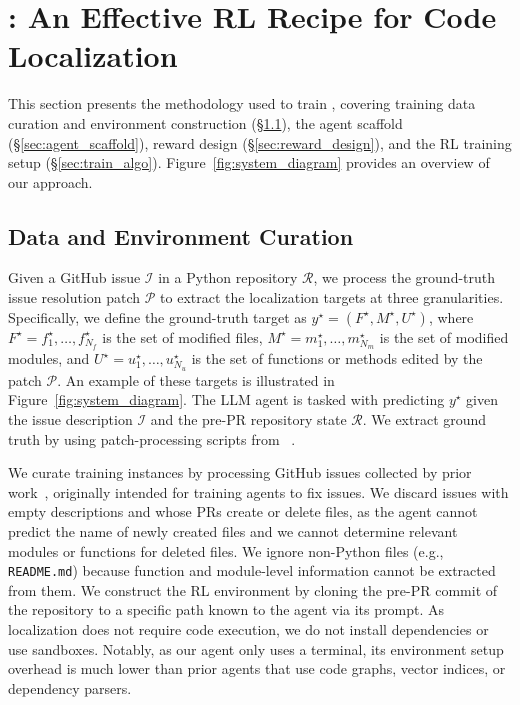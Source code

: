\section{\methodname: An Effective RL Recipe for Code Localization}

This section presents the methodology used to train \methodname, covering training data curation and environment construction (\S\ref{sec:data_creation}), the agent scaffold (\S\ref{sec:agent_scaffold}), reward design (\S\ref{sec:reward_design}), and the RL training setup (\S\ref{sec:train_algo}). Figure~\ref{fig:system_diagram} provides an overview of our approach.



\subsection{Data and Environment Curation}
\label{sec:data_creation}
Given a GitHub issue $\mathcal{I}$ in a Python repository $\mathcal{R}$, we process the ground-truth issue resolution patch $\mathcal{P}$ to extract the localization targets at three granularities. Specifically, we define the ground-truth target as $y^{\star} = (F^{\star}, M^{\star}, U^{\star})$, where $F^{\star} = {f_1^{\star}, \dots, f_{N_f}^{\star}}$ is the set of modified files, $M^{\star} = {m_1^{\star}, \dots, m_{N_m}^{\star}}$ is the set of modified modules, and $U^{\star} = {u_1^{\star}, \dots, u_{N_u}^{\star}}$ is the set of functions or methods edited by the patch $\mathcal{P}$. An example of these targets is illustrated in Figure~\ref{fig:system_diagram}. The LLM agent is tasked with predicting $y^{\star}$ given the issue description $\mathcal{I}$ and the pre-PR repository state $\mathcal{R}$. We extract ground truth by using patch-processing scripts from ~\citet{chen-etal-2025-locagent}.

We curate training instances by processing GitHub issues collected by prior work~\citep{yang2025swesmithscalingdatasoftware, pan2025trainingsoftwareengineeringagents}, originally intended for training agents to fix issues. We discard issues with empty descriptions and whose PRs create or delete files, as the agent cannot predict the name of newly created files and we cannot determine relevant modules or functions for deleted files. We ignore non-Python files (e.g., \texttt{README.md}) because function and module-level information cannot be extracted from them. We construct the RL environment by cloning the pre-PR commit of the repository to a specific path known to the agent via its prompt. As localization does not require code execution, we do not install dependencies or use sandboxes. Notably, as our agent only uses a terminal, its environment setup overhead is much lower than prior agents that use code graphs, vector indices, or dependency parsers.

